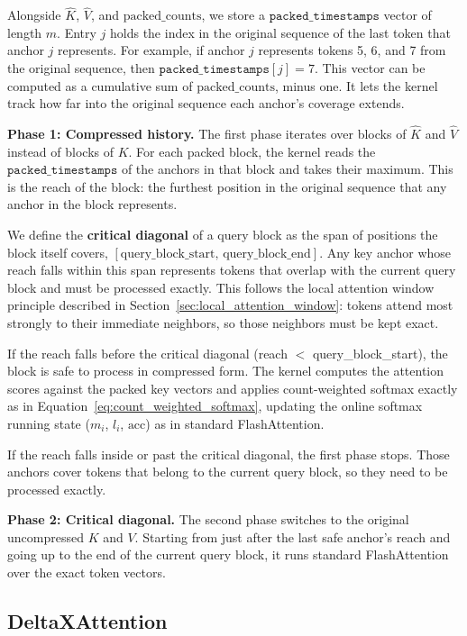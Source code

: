 Alongside $\hat{K}$, $\hat{V}$, and $\text{packed\_counts}$, we store a $\texttt{packed\_timestamps}$ vector of length $m$. Entry $j$ holds the index in the original sequence of the last token that anchor $j$ represents. For example, if anchor $j$ represents tokens 5, 6, and 7 from the original sequence, then $\texttt{packed\_timestamps}[j] = 7$. This vector can be computed as a cumulative sum of $\text{packed\_counts}$, minus one. It lets the kernel track how far into the original sequence each anchor's coverage extends.

\textbf{Phase 1: Compressed history.} The first phase iterates over blocks of $\hat{K}$ and $\hat{V}$ instead of blocks of $K$. For each packed block, the kernel reads the $\texttt{packed\_timestamps}$ of the anchors in that block and takes their maximum. This is the reach of the block: the furthest position in the original sequence that any anchor in the block represents.

We define the \textbf{critical diagonal} of a query block as the span of positions the block itself covers, $[\text{query\_block\_start},\, \text{query\_block\_end}]$. Any key anchor whose reach falls within this span represents tokens that overlap with the current query block and must be processed exactly. This follows the local attention window principle described in Section~\ref{sec:local_attention_window}: tokens attend most strongly to their immediate neighbors, so those neighbors must be kept exact.

If the reach falls before the critical diagonal (reach $<$ query\_block\_start), the block is safe to process in compressed form. The kernel computes the attention scores against the packed key vectors and applies count-weighted softmax exactly as in Equation~\ref{eq:count_weighted_softmax}, updating the online softmax running state ($m_i$, $l_i$, $\text{acc}$) as in standard FlashAttention.

If the reach falls inside or past the critical diagonal, the first phase stops. Those anchors cover tokens that belong to the current query block, so they need to be processed exactly.

\textbf{Phase 2: Critical diagonal.} The second phase switches to the original uncompressed $K$ and $V$. Starting from just after the last safe anchor's reach and going up to the end of the current query block, it runs standard FlashAttention over the exact token vectors.

\subsection{DeltaXAttention}
\label{sec:xattention_adaptation}

